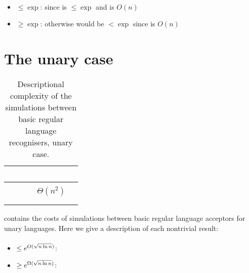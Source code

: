 \paragraph{\ODLA{}\tto\TDFA}
\begin{itemize}
	\item $\le\exp$: since \hyperref[cost:1DLAto1DFA]{\ODLA{}\tto\ODFA} is $\le\exp$ and \ODFA{}\tto\TDFA is $O(n)$
	\item $\ge\exp$: otherwise \hyperref[cost:1DLAto2NFA]{\ODLA{}\tto\TNFA} would be $<\exp$ since \TDFA{}\tto\TNFA is $O(n)$
\end{itemize}


\section{The unary case}

\begin{table}
	\centering
	\renewcommand{\arraystretch}{1.2}
	\begin{tabular}{|l|l|l|p{4.3em}|l|}
		\hline
		~     & \ODFA           & \ONFA           & \TDFA                                            & \TNFA  \\ \hline
		\ODFA & \cY             & \Ctriv          & \Ctriv                                           & \Ctriv \\ \hline
		\ONFA & \rbt{$\CsubEq$} & \cY             & \cR $\Theta(n^2)$                                & \Ctriv \\ \hline
		\TDFA & \rbt{$\CsubEq$} & \rbt{$\CsubEq$} & \cY                                              & \Ctriv \\ \hline
		\TNFA & \rbt{$\CsubEq$} & \rbt{$\CsubEq$} & \cR \rbt[.4]{$\le\Csubln$} \rbt[.3]{$\ge\Cpoly$} & \cY    \\ \hline
	\end{tabular}
	\caption{Descriptional complexity of the simulations between basic regular language recognisers, unary case.}
	\label{tab:sims-core-unary}
\end{table}

 contains the costs of simulations between basic regular language acceptors for unary languages.
Here we give a description of each nontrivial result:

\paragraph{\ONFA{}\tto\ODFA}
\begin{itemize}
	\item $\le e^{O(\sqrt{n\ln n})}$: \cite{Chr86}
	\item $\ge e^{\Omega(\sqrt{n\ln n})}$: \cite{Chr86}
\end{itemize}
